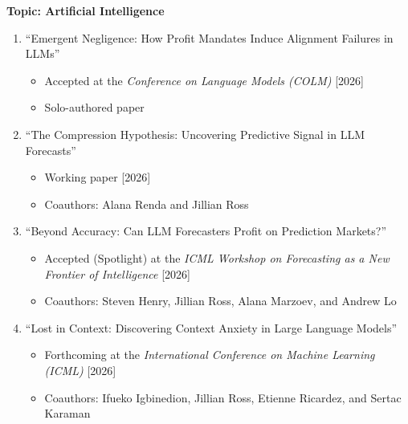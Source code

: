 \documentclass[11pt]{article}
\begin{document}
{\bf Topic: Artificial Intelligence} \\
\vspace*{-.2in}
\begin{enumerate}

\item ``Emergent Negligence: How Profit Mandates Induce Alignment Failures in LLMs''
\begin{itemize}
\vspace*{-.07in}
	\item Accepted at the {\it Conference on Language Models (COLM)} [2026]
\vspace*{-.07in}
	\item Solo-authored paper
\end{itemize}
\vskip 0.24cm

\item ``The Compression Hypothesis: Uncovering Predictive Signal in LLM Forecasts''
\begin{itemize}
\vspace*{-.07in}
	\item Working paper [2026]
\vspace*{-.07in}
	\item Coauthors: Alana Renda and Jillian Ross
\end{itemize}
\vskip 0.24cm

\item ``Beyond Accuracy: Can LLM Forecasters Profit on Prediction Markets?''
\begin{itemize}
\vspace*{-.07in}
	\item Accepted (Spotlight) at the {\it ICML Workshop on Forecasting as a New Frontier of Intelligence} [2026]
\vspace*{-.07in}
	\item Coauthors: Steven Henry, Jillian Ross, Alana Marzoev, and Andrew Lo
\end{itemize}
\vskip 0.24cm

\item ``Lost in Context: Discovering Context Anxiety in Large Language Models''
\begin{itemize}
\vspace*{-.07in}
	\item Forthcoming at the {\it International Conference on Machine Learning (ICML)} [2026]
\vspace*{-.07in}
	\item Coauthors: Ifueko Igbinedion, Jillian Ross, Etienne Ricardez, and Sertac Karaman
\end{itemize}
\vskip 0.24cm


\end{enumerate}
\end{document}
